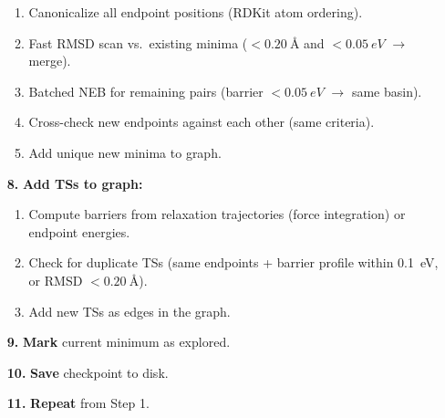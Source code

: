 \documentclass[11pt,a4paper]{article}
\begin{document}
\begin{enumerate}[leftmargin=2cm]
\begin{enumerate}[label=\alph*.]
        \item Canonicalize all endpoint positions (RDKit atom ordering).
        \item Fast RMSD scan vs.\ existing minima ($< \SI{0.20}{\angstrom}$ and $< \SI{0.05}{eV}$ $\to$ merge).
        \item Batched NEB for remaining pairs (barrier $< \SI{0.05}{eV}$ $\to$ same basin).
        \item Cross-check new endpoints against each other (same criteria).
        \item Add unique new minima to graph.
    \end{enumerate}
    \item[\textbf{8.}] \textbf{Add TSs to graph:}
    \begin{enumerate}[label=\alph*.]
        \item Compute barriers from relaxation trajectories (force integration) or endpoint energies.
        \item Check for duplicate TSs (same endpoints + barrier profile within \SI{0.1}{eV}, or RMSD $< \SI{0.20}{\angstrom}$).
        \item Add new TSs as edges in the graph.
    \end{enumerate}
    \item[\textbf{9.}] \textbf{Mark} current minimum as explored.
    \item[\textbf{10.}] \textbf{Save} checkpoint to disk.
    \item[\textbf{11.}] \textbf{Repeat} from Step 1.
\end{enumerate}
\end{document}

